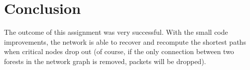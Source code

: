 \documentclass[a4paper, 10pt]{article}
\begin{document}
\section{Conclusion}
The outcome of this assignment was very successful. With the small code improvements, the network is able to recover and recompute the shortest paths when critical nodes drop out (of course, if the only connection between two forests in the network graph is removed, packets will be dropped).
\end{document}
